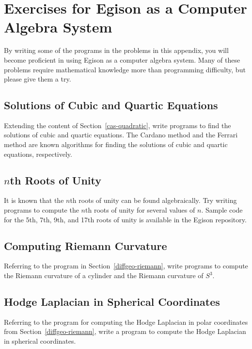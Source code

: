 \chapter{Exercises for Egison as a Computer Algebra System}

By writing some of the programs in the problems in this appendix, you will become proficient in using Egison as a computer algebra system.
Many of these problems require mathematical knowledge more than programming difficulty, but please give them a try.

\section*{Solutions of Cubic and Quartic Equations}

Extending the content of Section~\ref{cas-quadratic}, write programs to find the solutions of cubic and quartic equations.
The Cardano method and the Ferrari method are known algorithms for finding the solutions of cubic and quartic equations, respectively.

\section*{$n$th Roots of Unity}

It is known that the $n$th roots of unity can be found algebraically.
Try writing programs to compute the $n$th roots of unity for several values of $n$.
Sample code for the 5th, 7th, 9th, and 17th roots of unity is available in the Egison repository.

\section*{Computing Riemann Curvature}

Referring to the program in Section~\ref{diffgeo-riemann}, write programs to compute the Riemann curvature of a cylinder and the Riemann curvature of $S^3$.

\section*{Hodge Laplacian in Spherical Coordinates}

Referring to the program for computing the Hodge Laplacian in polar coordinates from Section~\ref{diffgeo-riemann}, write a program to compute the Hodge Laplacian in spherical coordinates.
